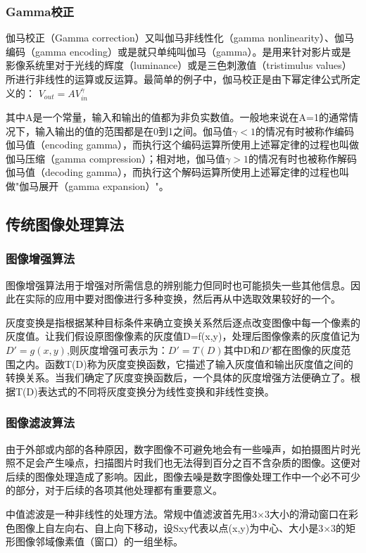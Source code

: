 \subsubsection{Gamma校正}
伽马校正（Gamma correction）又叫伽马非线性化（gamma nonlinearity）、伽马编码（gamma encoding）或是就只单纯叫伽马（gamma）。是用来针对影片或是影像系统里对于光线的辉度（luminance）或是三色刺激值（tristimulus values）所进行非线性的运算或反运算。最简单的例子中，伽马校正是由下幂定律公式所定义的：
$V_{out}=AV_{in}^\gamma$

其中A是一个常量，输入和输出的值都为非负实数值。一般地来说在A=1的通常情况下，输入输出的值的范围都是在0到1之间。伽马值$\gamma < 1$的情况有时被称作编码伽马值（encoding gamma），而执行这个编码运算所使用上述幂定律的过程也叫做伽马压缩（gamma compression）；相对地，伽马值$\gamma > 1$的情况有时也被称作解码伽马值（decoding gamma），而执行这个解码运算所使用上述幂定律的过程也叫做"伽马展开（gamma expansion）"。

\subsection{传统图像处理算法}

\subsubsection{图像增强算法}
图像增强算法用于增强对所需信息的辨别能力但同时也可能损失一些其他信息。因此在实际的应用中要对图像进行多种变换，然后再从中选取效果较好的一个。

灰度变换是指根据某种目标条件来确立变换关系然后逐点改变图像中每一个像素的灰度值。让我们假设原图像像素的灰度值D=f(x,y)，处理后图像像素的灰度值记为$D'=g(x,y)$,则灰度增强可表示为：$D'=T(D)$其中D和$D'$都在图像的灰度范围之内。函数T(D)称为灰度变换函数，它描述了输入灰度值和输出灰度值之间的转换关系。当我们确定了灰度变换函数后，一个具体的灰度增强方法便确立了。根据T(D)表达式的不同将灰度变换分为线性变换和非线性变换。

\subsubsection{图像滤波算法}
由于外部或内部的各种原因，数字图像不可避免地会有一些噪声，如拍摄图片时光照不足会产生噪点，扫描图片时我们也无法得到百分之百不含杂质的图像。这便对后续的图像处理造成了影响。因此，图像去噪是数字图像处理工作中一个必不可少的部分，对于后续的各项其他处理都有重要意义。

中值滤波是一种非线性的处理方法。常规中值滤波首先用3×3大小的滑动窗口在彩色图像上自左向右、自上向下移动，设Sxy代表以点(x,y)为中心、大小是3×3的矩形图像邻域像素值（窗口）的一组坐标。

